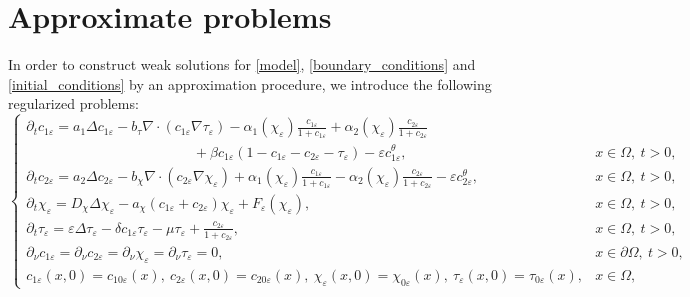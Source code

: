 \documentclass[a4paper,10pt]{article}
\theoremstyle{definition}
\begin{document}
\section{Approximate problems}\label{sec:approx-probl}
In order to construct weak solutions for \eqref{model}, \eqref{boundary_conditions} and \eqref{initial_conditions} by an approximation procedure, we introduce the following regularized problems:
\begin{equation}
  \label{sys1}
  \begin{cases}
    \partial_t c_{1\varepsilon} = a_1\Delta c_{1\varepsilon} - b_{\tau} \nabla \cdot \left( c_{1\varepsilon}  \nabla \tau_\varepsilon\right) - \alpha_1(\chi_\varepsilon)  \frac{c_{1\varepsilon}}{1 + c_{1\varepsilon}}   + \alpha_2(\chi_\varepsilon) \frac{c_{2\varepsilon}}{1 + c_{2\varepsilon}} \\[5pt]
    \hspace{5cm}+ \beta c_{1\varepsilon}(1 - c_{1\varepsilon} - c_{2\varepsilon} - \tau_\varepsilon) - \varepsilon c_{1\varepsilon}^\theta ,    &   x \in \Omega,\  t > 0,  \\[5pt]
    \partial_t c_{2\varepsilon}  = a_2\Delta c_{2\varepsilon} - b_\chi \nabla \cdot \left( c_{2\varepsilon} \nabla \chi_\varepsilon\right) + \alpha_1(\chi_\varepsilon) \frac{c_{1\varepsilon}}{1 + c_{1\varepsilon}}-\alpha_2(\chi_\varepsilon)  \frac{c_{2\varepsilon}}{1 + c_{2\varepsilon}} - \varepsilon c_{2\varepsilon}^\theta,    &    x \in \Omega,\  t > 0,           \\[5pt]
    \partial_t \chi_\varepsilon = D_\chi \Delta \chi_\varepsilon -  a_\chi  (c_{1\varepsilon} + c_{2\varepsilon})\chi_\varepsilon + F_\varepsilon(\chi_\varepsilon),                                        &      x \in \Omega,\ t > 0,           \\[5pt]
    \partial_t \tau_\varepsilon = \varepsilon \Delta \tau_\varepsilon - \delta c_{1\varepsilon}  \tau_\varepsilon - \mu \tau_\varepsilon +  \frac{c_{2\varepsilon}}{1 + c_{2\varepsilon}}, &   x \in \Omega,\ t > 0,\\[5pt]
   \partial_\nu c_{1\varepsilon} = \partial_\nu c_{2\varepsilon} = \partial_\nu \chi_\varepsilon = \partial_\nu \tau_\varepsilon = 0,               &  x \in \partial \Omega,\ t > 0 , \\[5pt]
   c_{1\varepsilon}(x, 0) = c_{10\varepsilon}(x),~ c_{2\varepsilon}(x, 0) = c_{20\varepsilon}(x),~ \chi_{\varepsilon}(x, 0) = \chi_{0\varepsilon}(x),~ \tau_{\varepsilon}(x, 0) = \tau_{0\varepsilon}(x),                     &  x \in \Omega,\ 
  \end{cases}
\end{equation}
\end{document}
